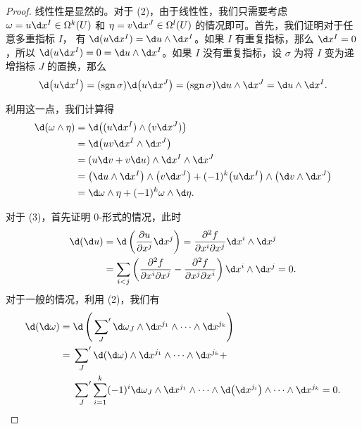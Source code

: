 \begin{proof}
  线性性是显然的。对于 (2)，由于线性性，我们只需要考虑 $\omega=u\d x^I\in\Omega^k(U)$
  和 $\eta=v\d x^J\in\Omega^l(U)$ 的情况即可。首先，我们证明对于任意多重指标 $I$，
  有 $\d(u\d x^I)=\d u\wedge\d x^I$。如果 $I$ 有重复指标，那么 $\d x^I=0$，所以
  $\d(u\d x^I)=0=\d u\wedge\d x^I$。如果 $I$ 没有重复指标，设 $\sigma$
  为将 $I$ 变为递增指标 $J$ 的置换，那么
  \[
    \d\bigl(u\d x^I\bigr)=(\sgn\sigma)\d\bigl(u\d x^J\bigr)
    = (\sgn\sigma)\d u\wedge\d x^J=\d u\wedge\d x^I.
  \]

  利用这一点，我们计算得
  \begin{align*}
    \d(\omega\wedge\eta)&=\d\bigl((u\d x^I)\wedge (v\d x^J)\bigr)\\
    &=\d\bigl(uv\d x^I\wedge\d x^J\bigr)\\
    &=(u\d v+v\d u)\wedge \d x^I\wedge\d x^J\\
    &=\bigl(\d u\wedge \d x^I\bigr)\wedge\bigl(v\d x^J\bigr)
    +(-1)^k\bigl(u\d x^I\bigr)\wedge \bigl(\d v\wedge\d x^J\bigr)\\
    &=\d \omega\wedge \eta+(-1)^k\omega\wedge \d\eta.
  \end{align*}

  对于 (3)，首先证明 $0$-形式的情况，此时
  \begin{align*}
    \d(\d u)&=\d \left(\frac{\partial u}{\partial x^j}\d x^j\right)
    =\frac{\partial^2 f}{\partial x^i\partial x^j}\d x^i\wedge\d x^j\\
    &=\sum_{i<j}\left(\frac{\partial^2 f}{\partial x^i\partial x^j}-\frac{\partial^2 f}{\partial x^j\partial x^i}\right)
    \d x^i\wedge\d x^j=0.
  \end{align*}
  对于一般的情况，利用 (2)，我们有
  \begin{align*}
    \d(\d\omega)&=\d\left(\sideset{}{'}\sum_J\d\omega_J\wedge\d x^{j_1}\wedge\cdots\wedge\d x^{j_k}\right)\\
    &=\sideset{}{'}\sum_J\d(\d\omega)\wedge\d x^{j_1}\wedge\cdots\wedge\d x^{j_k}+\\
    &\hphantom{{}={}}\sideset{}{'}\sum_J
    \sum_{i=1}^k(-1)^i\d\omega_J\wedge\d x^{j_1}\wedge\cdots\wedge
    \d\bigl(\d x^{j_i}\bigr)\wedge\cdots\wedge \d x^{j_k}=0.
  \end{align*}


\end{proof}
